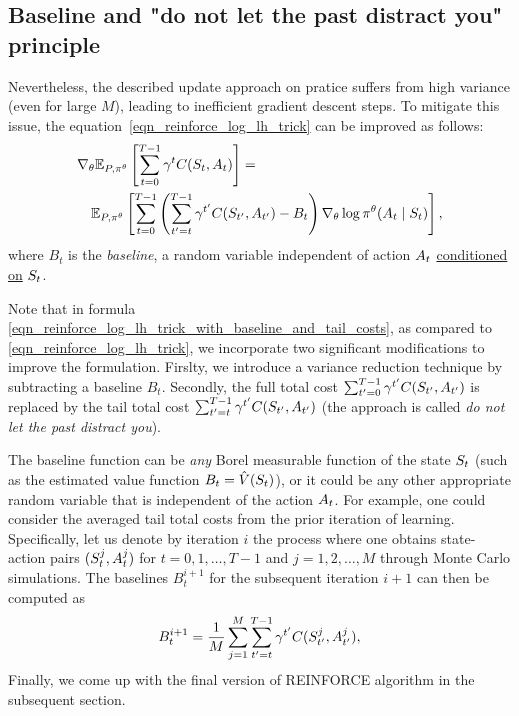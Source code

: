 \documentclass[12pt,twoside]{../../mitthesis}
\begin{document}
\subsection*{Baseline and "do not let the past distract you" principle}
Nevertheless, the described update approach on pratice suffers from high variance (even for large $M$), leading to inefficient gradient descent steps. 
To mitigate this issue, the equation~\eqref{eqn_reinforce_log_lh_trick} can be improved as follows:
\begin{equation}
    \label{eqn_reinforce_log_lh_trick_with_baseline_and_tail_costs}
    \begin{aligned}
    &\nabla_{\theta} \E[\transit, \policy^{\theta}]{\sum_{t = 0}^{T-1} \gamma ^ t \Cost(\State_{t}, \Action_{t})} = \\ 
    &\quad\E[\transit, \policy^{\theta}]{ \sum_{t = 0}^{T-1} \left( \sum_{t' = t}^{T-1} \gamma ^ {t'} \Cost(\State_{t'}, \Action_{t'}) - B_t \right) \nabla_{\theta}\log \policy^{\theta}(\Action_t \mid \State_t)},
    \end{aligned}
\end{equation}
where $B_t$ is the \textit{baseline}, a random variable independent of action $A_t$ \href{https://en.wikipedia.org/wiki/Conditional_independence#Conditional_independence_of_random_vectors}{conditioned on} $S_t$. 

Note that in formula \eqref{eqn_reinforce_log_lh_trick_with_baseline_and_tail_costs}, as compared to \eqref{eqn_reinforce_log_lh_trick}, we incorporate two significant modifications to improve the formulation. 
Firslty, we introduce a variance reduction technique by subtracting a baseline $B_t$. 
Secondly, the full total cost $\sum_{t' = 0}^{T-1} \gamma ^ {t'} C(S_{t'}, A_{t'})$ is replaced by the tail total cost $\sum_{t' = t}^{T-1} \gamma ^ {t'} C(S_{t'}, A_{t'})$ (the approach is called \textit{do not let the past distract you}). 

The baseline function can be \textit{any} Borel measurable function of the state $S_t$ (such as the estimated value function $B_t = \hat{V}(S_t)$), or it could be any other appropriate random variable that is independent of the action $A_t$. 
For example, one could consider the averaged tail total costs from the prior iteration of learning. 
Specifically, let us denote by iteration $i$ the process where one obtains state-action pairs $(S_t^j, A_t^j)$ for $t = 0, 1, \ldots, T - 1$ and $j = 1, 2, \ldots, M$ through Monte Carlo simulations. 
The baselines $B_t^{i+1}$ for the subsequent iteration $i+1$ can then be computed as
$$
    B_{t}^{i + 1} = \frac{1}{M}\sum_{j = 1}^M \sum_{t' = t}^{T-1} \gamma^{t'} C(S^j_{t'}, A^j_{t'}),
$$
Finally, we come up with the final version of REINFORCE algorithm in the subsequent section. 
\end{document}
